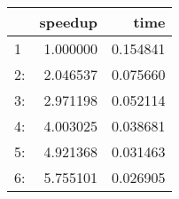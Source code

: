 \begin{tabular}{lrr}
\toprule
{} &   speedup &      time \\
\midrule
1  &  1.000000 &  0.154841 \\
2: &  2.046537 &  0.075660 \\
3: &  2.971198 &  0.052114 \\
4: &  4.003025 &  0.038681 \\
5: &  4.921368 &  0.031463 \\
6: &  5.755101 &  0.026905 \\
\bottomrule
\end{tabular}
